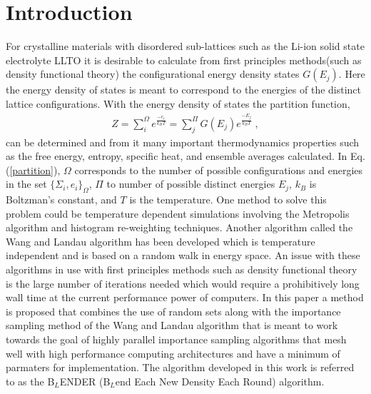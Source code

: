\documentclass[aps,prl,reprint,superscriptaddress,showkeys]{revtex4-1}
\begin{document}
\section{Introduction}
For crystalline  materials  with disordered sub-lattices such as the Li-ion solid state electrolyte LLTO it is desirable to calculate from first principles methods(such as density functional theory\cite{kohn:1965}) the configurational  energy density states $G(E_j)$. Here the energy density of states is meant to correspond to the energies of the distinct lattice configurations. With the energy density of states the partition function,
\begin{equation}
\begin{split}
Z = \sum_{i}^{\Omega}e^{\frac{-e_i}{k_B T} }= \sum_{j}^{\Pi}G(E_j)e^{\frac{-E_j}{k_BT}} \;,
\end{split}
\label{partition}
\end{equation}
can be  determined and from it many important thermodynamics properties such as the free energy, entropy, specific heat, and ensemble averages calculated. In Eq. (\ref{partition}), $\Omega$ corresponds to the number of possible configurations and energies in the set $\{\Sigma_i,e_i\}_\Omega$, $\Pi$ to number of possible distinct energies $E_j$, $k_B$ is Boltzman's constant, and $T$ is the temperature. One method to solve this problem could be temperature dependent simulations involving the  Metropolis algorithm and histogram re-weighting techniques\cite{metropolis_equation_1953, landau_MC_simulations}.   Another algorithm called the  Wang and Landau algorithm\cite{WL_phys_rev_lett} has been developed which is temperature independent and is based on a random walk in energy space.  An issue with these algorithms in use with first principles methods such as density functional theory is the large number of iterations needed which would require a prohibitively long wall time at the current performance power of computers.  In this paper a method is proposed that combines the use of random sets along with the importance sampling method of the Wang and Landau algorithm that is meant to work towards the goal of highly parallel importance sampling algorithms that mesh well with high performance computing architectures and have a minimum of parmaters for implementation. The algorithm developed in this work is referred to as the B$_{L}$ENDER (B$_{L}$end Each New Density Each Round) algorithm. 
\end{document}
